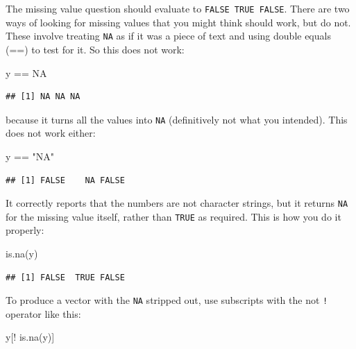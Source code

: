 \documentclass[
]{book}
\newenvironment{Shaded}{\begin{snugshade}}{\end{snugshade}}
\newcommand{\ConstantTok}[1]{\textcolor[rgb]{0.00,0.00,0.00}{#1}}
\newcommand{\FunctionTok}[1]{\textcolor[rgb]{0.00,0.00,0.00}{#1}}
\newcommand{\NormalTok}[1]{#1}
\newcommand{\SpecialCharTok}[1]{\textcolor[rgb]{0.00,0.00,0.00}{#1}}
\newcommand{\StringTok}[1]{\textcolor[rgb]{0.31,0.60,0.02}{#1}}
\theoremstyle{definition}
\theoremstyle{definition}
\theoremstyle{definition}
\theoremstyle{definition}
\theoremstyle{remark}
\begin{document}
The missing value question should evaluate to \texttt{FALSE\ TRUE\ FALSE}. There are two ways of looking for missing values that you might think should work, but do not. These involve treating \texttt{NA} as if it was a piece of text and using double equals (==) to test for it. So this does not work:

\begin{Shaded}
\begin{Highlighting}[]
\NormalTok{y }\SpecialCharTok{==} \ConstantTok{NA}
\end{Highlighting}
\end{Shaded}

\begin{verbatim}
## [1] NA NA NA
\end{verbatim}

because it turns all the values into \texttt{NA} (definitively not what you intended). This does not work either:

\begin{Shaded}
\begin{Highlighting}[]
\NormalTok{y }\SpecialCharTok{==} \StringTok{"NA"}
\end{Highlighting}
\end{Shaded}

\begin{verbatim}
## [1] FALSE    NA FALSE
\end{verbatim}

It correctly reports that the numbers are not character strings, but it returns \texttt{NA} for the missing value itself, rather than \texttt{TRUE} as required. This is how you do it properly:

\begin{Shaded}
\begin{Highlighting}[]
\FunctionTok{is.na}\NormalTok{(y)}
\end{Highlighting}
\end{Shaded}

\begin{verbatim}
## [1] FALSE  TRUE FALSE
\end{verbatim}

To produce a vector with the \texttt{NA} stripped out, use subscripts with the not \texttt{!} operator like this:

\begin{Shaded}
\begin{Highlighting}[]
\NormalTok{y[}\SpecialCharTok{!} \FunctionTok{is.na}\NormalTok{(y)]}
\end{Highlighting}
\end{Shaded}
\end{document}
